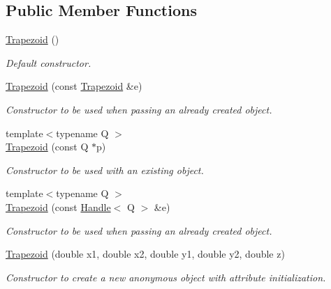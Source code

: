 \subsection*{Public Member Functions}
\begin{DoxyCompactItemize}
\item 
\hyperlink{class_d_d4hep_1_1_geometry_1_1_trapezoid_a98ba02f7b8317e9a68f5a20eae86cf37}{Trapezoid} ()
\begin{DoxyCompactList}\small\item\em Default constructor. \item\end{DoxyCompactList}\item 
\hyperlink{class_d_d4hep_1_1_geometry_1_1_trapezoid_a2af4ca8630cd37bfaf9f45cdb2708c1d}{Trapezoid} (const \hyperlink{class_d_d4hep_1_1_geometry_1_1_trapezoid}{Trapezoid} \&e)
\begin{DoxyCompactList}\small\item\em Constructor to be used when passing an already created object. \item\end{DoxyCompactList}\item 
{\footnotesize template$<$typename Q $>$ }\\\hyperlink{class_d_d4hep_1_1_geometry_1_1_trapezoid_a247acae1b4a9f18d7d996af8faf669ca}{Trapezoid} (const Q $\ast$p)
\begin{DoxyCompactList}\small\item\em Constructor to be used with an existing object. \item\end{DoxyCompactList}\item 
{\footnotesize template$<$typename Q $>$ }\\\hyperlink{class_d_d4hep_1_1_geometry_1_1_trapezoid_a9aee37748ae477139a44b6f7c25ef4f4}{Trapezoid} (const \hyperlink{class_d_d4hep_1_1_handle}{Handle}$<$ Q $>$ \&e)
\begin{DoxyCompactList}\small\item\em Constructor to be used when passing an already created object. \item\end{DoxyCompactList}\item 
\hyperlink{class_d_d4hep_1_1_geometry_1_1_trapezoid_a3c8b1150038001c51909aab4350c7228}{Trapezoid} (double x1, double x2, double y1, double y2, double z)
\begin{DoxyCompactList}\small\item\em Constructor to create a new anonymous object with attribute initialization. \item\end{DoxyCompactList}\item 

\end{DoxyCompactItemize}

